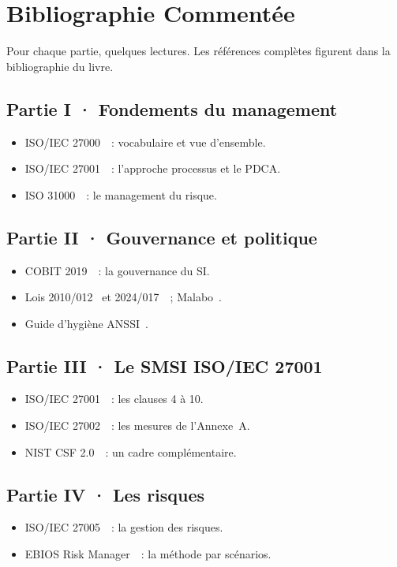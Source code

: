 \chapter{Bibliographie Commentée}
\label{ann:bibliographie}

Pour chaque partie, quelques lectures. Les références complètes figurent dans
la bibliographie du livre.

\section*{Partie I · Fondements du management}
\begin{itemize}
    \item ISO/IEC 27000~\cite{iso27000}~: vocabulaire et vue d'ensemble.
    \item ISO/IEC 27001~\cite{iso27001}~: l'approche processus et le PDCA.
    \item ISO 31000~\cite{iso31000}~: le management du risque.
\end{itemize}

\section*{Partie II · Gouvernance et politique}
\begin{itemize}
    \item COBIT 2019~\cite{cobit2019}~: la gouvernance du SI.
    \item Lois 2010/012~\cite{loi2010012} et 2024/017~\cite{loi2024017}~; Malabo~\cite{malabo2014}.
    \item Guide d'hygiène ANSSI~\cite{anssihygiene2017}.
\end{itemize}

\section*{Partie III · Le SMSI ISO/IEC 27001}
\begin{itemize}
    \item ISO/IEC 27001~\cite{iso27001}~: les clauses 4 à 10.
    \item ISO/IEC 27002~\cite{iso27002}~: les mesures de l'Annexe~A.
    \item NIST CSF 2.0~\cite{nistcsf2024}~: un cadre complémentaire.
\end{itemize}

\section*{Partie IV · Les risques}
\begin{itemize}
    \item ISO/IEC 27005~\cite{iso27005}~: la gestion des risques.
    \item EBIOS Risk Manager~\cite{ebios2018}~: la méthode par scénarios.
\end{itemize}

